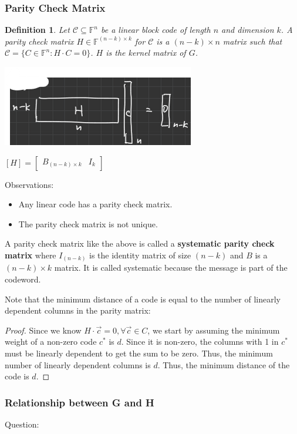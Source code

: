 \documentclass[letterpaper,12pt]{article}
\newtheorem{definition}{Definition}
\begin{document}
\subsubsection{Parity Check Matrix}
\begin{definition}
    Let $\mathcal{C}\subseteq \mathbb{F}^n$ be a linear block code of length $n$ and dimension $k$. A parity check matrix $H\in \mathbb{F}^{(n-k)\times k}$ for $\mathcal{C}$ is a $(n-k)\times n$ matrix such that $\mathcal{C}=\{C\in \mathbb{F}^n: H\cdot C=0\}$. $H$ is the kernel matrix of $G$.
\end{definition}
\includegraphics*{./Images/Parity Matrix.png}

$[H]= \begin{bmatrix}
        B_{(n-k)\times k} & I_{k}
    \end{bmatrix}$

Observations:\begin{itemize}
    \item Any linear code has a parity check matrix.
    \item The parity check matrix is not unique.
\end{itemize}
A parity check matrix like the above is called a \textbf{systematic parity check matrix} where $I_{(n-k)}$ is the identity matrix of size $(n-k)$ and $B$ is a $(n-k)\times k$ matrix. It is called systematic because the message is part of the codeword.

Note that the minimum distance of a code is equal to the number of linearly dependent columns in the parity matrix: \begin{proof}
    Since we know $H\cdot \vec{c}=0,\forall \vec{c}\in C$, we start by assuming the minimum weight of a non-zero code $c^*$ is $d$. Since it is non-zero, the columns with 1 in $c^*$ must be linearly dependent to get the sum to be zero. Thus, the minimum number of linearly dependent columns is $d$. Thus, the minimum distance of the code is $d$.
\end{proof}
\subsubsection{Relationship between G and H}
Question:
\end{document}
